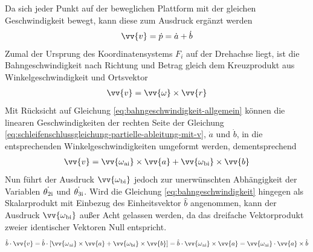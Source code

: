 \documentclass[Bachelor, BMR, ngerman]{twbook}
\begin{document}
    \noindent
    Da sich jeder Punkt auf der beweglichen Plattform mit der gleichen Geschwindigkeit bewegt, kann diese zum Ausdruck ergänzt werden
    \newline
    \begin{align}
        \vv{v} = \dot{p} = \dot{a} + \dot{b}
        \label{eq:schleifenschlussgleichung-partielle-ableitung-mit-v}
    \end{align}
    \noindent
    Zumal der Ursprung des Koordinatensystems $F_i$ auf der Drehachse liegt, ist die Bahngeschwindigkeit nach Richtung und Betrag gleich dem Kreuzprodukt aus Winkelgeschwindigkeit und Ortsvektor
    \newline
    \begin{align}
        \vv{v} = \vv{\omega} \times \vv{r}         
        \label{eq:bahngeschwindigkeit-allgemein}
    \end{align}
    \noindent
    Mit Rücksicht auf Gleichung \ref{eq:bahngeschwindigkeit-allgemein} können die linearen Geschwindigkeiten der rechten Seite der Gleichung \ref{eq:schleifenschlussgleichung-partielle-ableitung-mit-v}, $\dot{a}$ und $\dot{b}$, in die entsprechenden Winkelgeschwindigkeiten umgeformt werden, dementsprechend
    \newline
    \begin{align}
        \vv{v} = \vv{\omega\textsubscript{ai}} \times \vv{a} + \vv{\omega\textsubscript{bi}} \times \vv{b}         
        \label{eq:bahngeschwindigkeit}
    \end{align}
    \noindent
    Nun führt der Ausdruck $\vv{\omega\textsubscript{bi}}$ jedoch zur unerwünschten Abhängigkeit der Variablen $\dot{\theta\textsubscript{2i}}$ und $\dot{\theta\textsubscript{3i}}$.
    Wird die Gleichung \ref{eq:bahngeschwindigkeit} hingegen als Skalarprodukt mit Einbezug des Einheitsvektor $\hat{b}$ angenommen, kann der Ausdruck $\vv{\omega\textsubscript{bi}}$ außer Acht gelassen werden, da das dreifache Vektorprodukt zweier identischer Vektoren Null entspricht.
    \newline
    \begin{align}
        \hat{b} \cdot \vv{v} = \hat{b} \cdot [\vv{\omega\textsubscript{ai}} \times \vv{a} + \vv{\omega\textsubscript{bi}} \times \vv{b}] = \hat{b} \cdot \vv{\omega\textsubscript{ai}} \times \vv{a} = \vv{\omega\textsubscript{ai}} \cdot \vv{a} \times \hat{b}    
        \label{eq:bahngeschwindigkeit-vektorprodukt}
    \end{align}
\end{document}
